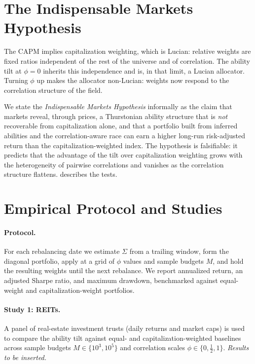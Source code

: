 \documentclass[11pt]{article}
\begin{document}
\section{The Indispensable Markets Hypothesis}
\label{sec:capm}

The CAPM implies capitalization weighting, which is Lucian: relative weights are
fixed ratios independent of the rest of the universe and of correlation. The
ability tilt at $\phi = 0$ inherits this independence and is, in that limit, a
Lucian allocator. Turning $\phi$ up makes the allocator non-Lucian: weights now
respond to the correlation structure of the field.

We state the \emph{Indispensable Markets Hypothesis} informally as the claim that
markets reveal, through prices, a Thurstonian ability structure that is
\emph{not} recoverable from capitalization alone, and that a portfolio built from
inferred abilities and the correlation-aware race can earn a higher long-run
risk-adjusted return than the capitalization-weighted index. The hypothesis is
falsifiable: it predicts that the advantage of the tilt over capitalization
weighting grows with the heterogeneity of pairwise correlations and vanishes as
the correlation structure flattens.  describes the tests.

\section{Empirical Protocol and Studies}
\label{sec:experiments}

\paragraph{Protocol.}
For each rebalancing date we estimate $\Sigma$ from a trailing window, form the
diagonal portfolio, apply  at a grid of $\phi$ values and sample
budgets $M$, and hold the resulting weights until the next rebalance. We report
annualized return, an adjusted Sharpe ratio, and maximum drawdown, benchmarked
against equal-weight and capitalization-weight portfolios.

\paragraph{Study 1: REITs.}
A panel of real-estate investment trusts (daily returns and market caps) is used
to compare the ability tilt against equal- and capitalization-weighted
baselines across sample budgets $M\in\{10^3,10^5\}$ and correlation scales
$\phi\in\{0,\tfrac12,1\}$. \emph{Results to be inserted.}
\end{document}
